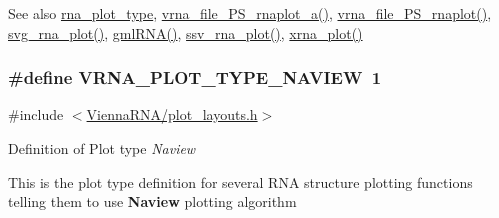 \begin{DoxySeeAlso}{See also}
\hyperlink{group__plotting__utils_ga5964c4581431b098b80027d6e14dcdd4}{rna\+\_\+plot\+\_\+type}, \hyperlink{group__plotting__utils_ga139a31dd0ba9fc6612431f67de901c31}{vrna\+\_\+file\+\_\+\+P\+S\+\_\+rnaplot\+\_\+a()}, \hyperlink{group__plotting__utils_gabdc8f6548ba4a3bc3cd868ccbcfdb86a}{vrna\+\_\+file\+\_\+\+P\+S\+\_\+rnaplot()}, \hyperlink{group__plotting__utils_gae7853539b5df98f294b4af434e979304}{svg\+\_\+rna\+\_\+plot()}, \hyperlink{group__plotting__utils_ga70834bc8c0aad4fe6824ff76ccb8f329}{gml\+R\+N\+A()}, \hyperlink{group__plotting__utils_gadd368528755f9a830727b680243541df}{ssv\+\_\+rna\+\_\+plot()}, \hyperlink{group__plotting__utils_ga2f6d5953e6a323df898896b8d6614483}{xrna\+\_\+plot()} 
\end{DoxySeeAlso}
\subsubsection[{\texorpdfstring{V\+R\+N\+A\+\_\+\+P\+L\+O\+T\+\_\+\+T\+Y\+P\+E\+\_\+\+N\+A\+V\+I\+EW}{VRNA_PLOT_TYPE_NAVIEW}}]{\setlength{\rightskip}{0pt plus 5cm}\#define V\+R\+N\+A\+\_\+\+P\+L\+O\+T\+\_\+\+T\+Y\+P\+E\+\_\+\+N\+A\+V\+I\+EW~1}\hypertarget{group__plotting__utils_ga94d4c863ecac2f220f76658afb92f964}{}\label{group__plotting__utils_ga94d4c863ecac2f220f76658afb92f964}


{\ttfamily \#include $<$\hyperlink{plot__layouts_8h}{Vienna\+R\+N\+A/plot\+\_\+layouts.\+h}$>$}



Definition of Plot type {\itshape Naview} 

This is the plot type definition for several R\+NA structure plotting functions telling them to use {\bfseries Naview} plotting algorithm

